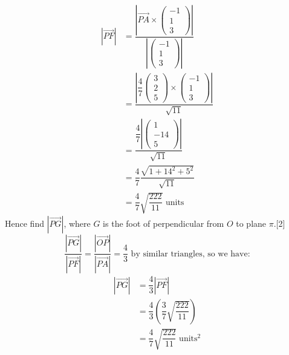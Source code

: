 \documentclass[12pt, a4 paper]{article}
\begin{document}
\begin{outline}[enumerate]
					\begin{align*}
						\left| {\overrightarrow {PF} } \right| & = \dfrac{{\left| {\overrightarrow {PA}  \times \left( {\begin{array}{*{20}{c}}{ - 1} \\1\\3\end{array}} \right)} \right|}}{{\left| {\left( {\begin{array}{*{20}{c}}{ - 1}\\1\\3\end{array}} \right)} \right|}}\\ &= \dfrac{{\left| {\dfrac{4}{7}\left( {\begin{array}{*{20}{c}}3\\2\\5\end{array}} \right) \times \left( {\begin{array}{*{20}{c}}{ - 1}\\1\\3\end{array}} \right)} \right|}}{{\sqrt {11} }}\\ &= \dfrac{{\dfrac{4}{7}\left| {\left( {\begin{array}{*{20}{c}}1\\{ - 14}\\5\end{array}} \right)} \right|}}{{\sqrt {11} }}\\ &= \dfrac{4}{7}\dfrac{\sqrt {1 + {14}^2 + {5^2}} }{\sqrt {11}}\\ &= \dfrac{4}{7}\sqrt {\dfrac{{222}}{{11}}} {\textrm{ units}}
					\end{align*}
					\color{black}
					\2 Hence find $\left| {\overrightarrow {PG} } \right|$, where $G$ is the foot of perpendicular from $O$ to plane $\pi $.\hfill[2]
					\color{blue}
					\[\dfrac{{\left| {\overrightarrow {PG} } \right|}}{{\left| {\overrightarrow {PF} } \right|}} = \dfrac{{\left| {\overrightarrow {OP} } \right|}}{{\left| {\overrightarrow {PA} } \right|}} = \dfrac{4}{3}{\textrm{ by similar triangles, so we have:}}\]
					\begin{align*}
						\left| {\overrightarrow {PG} } \right| & = \dfrac{4}{3}\left| {\overrightarrow {PF} } \right| \\ &= \dfrac{4}{3}\left( {\dfrac{3}{7}\sqrt {\dfrac{{222}}{{11}}} } \right)\\ &= \dfrac{4}{7}\sqrt {\dfrac{{222}}{{11}}} \;{\textrm{unit}}{{\textrm{s}}^2}
					\end{align*}
					\color{black}


\end{outline}
\end{document}
